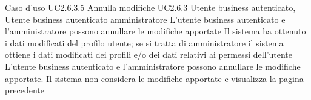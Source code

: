\UCtitle
{Caso d'uso UC2.6.3.5}
{Annulla modifiche}
\UC
{UC2.6.3}
{Utente business autenticato, Utente business autenticato amministratore}
{L'utente business autenticato e l'amministratore possono annullare le modifiche apportate}
{Il sistema ha ottenuto i dati modificati del profilo utente; se si tratta di amministratore il sistema ottiene i dati modificati dei profili e/o dei dati relativi ai permessi dell'utente}
\scenario
{L'utente business autenticato e l'amministratore possono annullare le modifiche apportate.}
\post
{Il sistema non considera le modifiche apportate e visualizza la pagina precedente}
